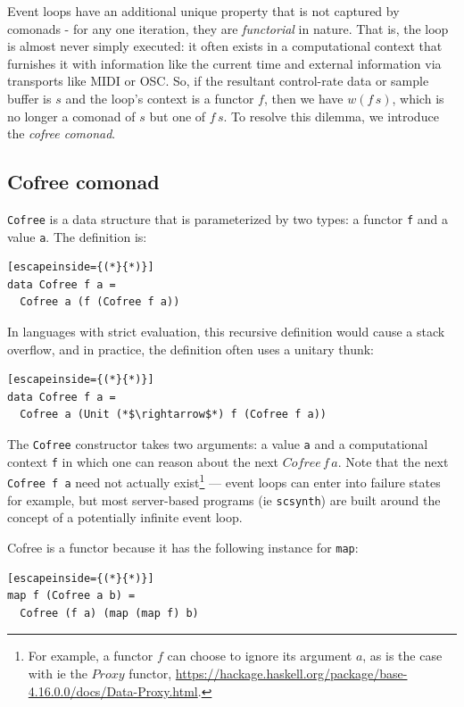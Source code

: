 \documentclass{article}
\begin{document}
Event loops have an additional unique property that is not captured by comonads - for any one iteration, they are \textit{functorial} in nature. That is, the loop is almost never simply executed: it often exists in a computational context that furnishes it with information like the current time and external information via transports like MIDI or OSC. So, if the resultant control-rate data or sample buffer is $s$ and the loop's context is a functor $f$, then we have $w (f\,s)$, which is no longer a comonad of $s$ but one of $f\,s$. To resolve this dilemma, we introduce the \textit{cofree comonad}.

\subsection{Cofree comonad}

\texttt{Cofree} is a data structure that is parameterized by two types: a functor \texttt{f} and a value \texttt{a}. The definition is:

\lstset{language=Haskell, style=psstyle}
\begin{lstlisting}[escapeinside={(*}{*)}]
data Cofree f a =
  Cofree a (f (Cofree f a))
\end{lstlisting}

In languages with strict evaluation, this recursive definition would cause a stack overflow, and in practice, the definition often uses a unitary thunk:

\lstset{language=Haskell, style=psstyle}
\begin{lstlisting}[escapeinside={(*}{*)}]
data Cofree f a =
  Cofree a (Unit (*$\rightarrow$*) f (Cofree f a))
\end{lstlisting}

The \texttt{Cofree} constructor takes two arguments: a value \texttt{a} and a computational context \texttt{f} in which one can reason about the next $Cofree\,f\,a$. Note that the next \texttt{Cofree f a} need not actually exist\footnote{For example, a functor $f$ can choose to ignore its argument $a$, as is the case with ie the $Proxy$ functor, \url{https://hackage.haskell.org/package/base-4.16.0.0/docs/Data-Proxy.html}.} --- event loops can enter into failure states for example, but most server-based programs (ie \texttt{scsynth}) are built around the concept of a potentially infinite event loop.

Cofree is a functor because it has the following instance for \texttt{map}:

\lstset{language=Haskell, style=psstyle}
\begin{lstlisting}[escapeinside={(*}{*)}]
map f (Cofree a b) =
  Cofree (f a) (map (map f) b)
\end{lstlisting}
\end{document}

